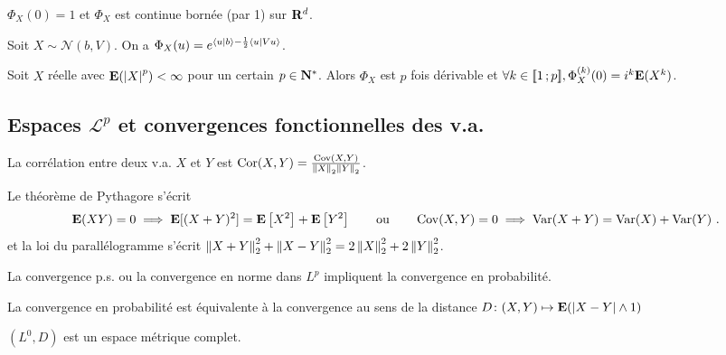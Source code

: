 	\begin{lem}
		$\Phi_X(0) = 1$ et $\Phi_X$ est continue bornée (par 1) sur $\mathbf{R}^d$.
	\end{lem}

	\begin{pop}
		Soit $X \sim \mathcal{N}(b,V)$.
		On a $\Phi_X(u) = e^{\left\langle u \mid b \right\rangle - \frac{1}{2} \left\langle u \mid Vu \right\rangle}$.
	\end{pop}

	\begin{pop}
		Soit $X$ réelle avec $\mathbf{E}(\left\lvert X\right\rvert^p) < \infty$ pour un certain $p \in \mathbf{N}^*$.
		Alors $\Phi_X$ est $p$ fois dérivable et $\forall k \in \mathopen{[\![}1\mathclose{}\mathpunct{};p\mathclose{]\!]}, \Phi_X^{(k)}(0) = i^k \mathbf{E}(X^k)$.
	\end{pop}



\subsection{Espaces $\mathcal{L}^p$ et convergences fonctionnelles des v.a.}

	La corrélation entre deux v.a. $X$ et $Y$ est $\operatorname{Cor}(X,Y) = \frac{\operatorname{Cov}(X,Y)}{\left\lVert X\right\rVert_2 \left\lVert Y\right\rVert_2}$.
	
	Le théorème de Pythagore s'écrit
	$$\esp(XY) = 0 \implies \esp[(X + Y)^2] = \esp \left[ X^2 \right] + \esp \left[ Y^2 \right]
		\qquad \text{ou} \qquad
		\Cov(X,Y) = 0 \implies \Var(X + Y) = \Var(X) + \Var(Y)\ .$$
	et la loi du parallélogramme s'écrit $\left\lVert X + Y\right\rVert_2^2 + \left\lVert X - Y\right\rVert_2^2 = 2 \left\lVert X\right\rVert_2^2 + 2 \left\lVert Y\right\rVert_2^2$.

	

	\begin{lem}
		La convergence p.s. ou la  convergence en norme dans $L^p$ impliquent la convergence en probabilité.
	\end{lem}

	\begin{lem}
		La convergence en probabilité est équivalente à la convergence au sens de la distance $D \colon (X,Y) \mapsto \mathbf{E}(\left\lvert X - Y\right\rvert \wedge 1)$
	\end{lem}
	
	\begin{thm}
		$(L^0,D)$ est un espace métrique complet.
	\end{thm}

